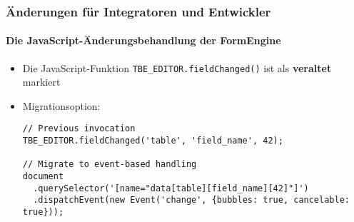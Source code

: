%

\begin{frame}[fragile]
	\frametitle{Änderungen für Integratoren und Entwickler}
	\framesubtitle{Die JavaScript-Änderungsbehandlung der FormEngine}


	\begin{itemize}
		\item Die JavaScript-Funktion \texttt{TBE\_EDITOR.fieldChanged()} ist
			als \textbf{veraltet} markiert
		\item Migrationsoption:
			\vspace{0.2cm}
\begin{lstlisting}
// Previous invocation
TBE_EDITOR.fieldChanged('table', 'field_name', 42);

// Migrate to event-based handling
document
  .querySelector('[name="data[table][field_name][42]"]')
  .dispatchEvent(new Event('change', {bubbles: true, cancelable: true}));
\end{lstlisting}

	\end{itemize}
\end{frame}

